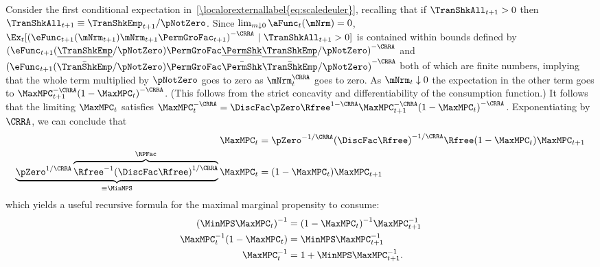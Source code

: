 \documentclass[\econtexRoot/BufferStockTheory]{subfiles}
\begin{document}
Consider the first conditional expectation in~\eqref{\localorexternallabel{eq:scaledeuler}},
recalling that if $\TranShkAll_{t+1}>0$ then $\TranShkAll_{t+1} \equiv
\TranShkEmp_{t+1}/\pNotZero$.  Since $\lim_{m \downarrow 0}
\aFunc_{t}(\mNrm) = 0$,
$\Ex_{t}[{(\eFunc_{t+1}(\mNrm_{t+1})\mNrm_{t+1}\PermGroFac_{t+1})}^{-\CRRA}~|~\TranShkAll_{t+1}>0]$
is contained within bounds defined by
${(\eFunc_{t+1}(\underline{\TranShkEmp}/\pNotZero) \PermGroFac\underline{\PermShk}
\underline{\TranShkEmp}/\pNotZero)}^{-\CRRA}$ and
${(\eFunc_{t+1}(\bar{\TranShkEmp}/\pNotZero) \PermGroFac\bar{\PermShk}
\bar{\TranShkEmp}/\pNotZero)}^{-\CRRA}$ both of which are finite numbers,
implying that the whole term multiplied by $\pNotZero$ goes to zero as
$\mNrm_{t}^{\CRRA}$ goes to zero.  As $\mNrm_{t} \downarrow 0$ the
expectation in the other term goes to $\MaxMPC _{t+1}^{-\CRRA
}{(1-\MaxMPC _{t})}^{-\CRRA }$. (This follows from the strict concavity
and differentiability of the consumption function.) It follows that
the limiting $\MaxMPC_{t}$ satisfies $\MaxMPC_{t}^{-\CRRA }=\DiscFac
\pZero\Rfree^{1-\CRRA }\MaxMPC_{t+1}^{-\CRRA }{(1-\MaxMPC
_{t})}^{-\CRRA }$. Exponentiating by $\CRRA$, we can conclude that
\begin{equation}\begin{gathered}\begin{aligned}
\MaxMPC_{t} & = \pZero^{-1/\CRRA} {(\DiscFac
\Rfree)}^{-1/\CRRA}\Rfree(1-\MaxMPC _{t})\MaxMPC _{t+1} \notag
\\ \underbrace{\pZero^{1/\CRRA}\overbrace{{\Rfree}^{-1}{(\DiscFac
    \Rfree)}^{1/\CRRA}}^{\RPFac}}_{\equiv \MinMPS}
\MaxMPC_{t} & = (1-\MaxMPC _{t})\MaxMPC _{t+1} \label{eq:MinMPSDef}
\end{aligned}\end{gathered}\end{equation}
which yields a useful recursive formula for the maximal marginal propensity to consume:
\begin{equation}\begin{gathered}\begin{aligned}
  {(\MinMPS \MaxMPC_{t})}^{-1}  & = {(1-\MaxMPC_{t})}^{-1}\MaxMPC_{t+1}^{-1}  \notag
\\ \MaxMPC_{t}^{-1}(1-\MaxMPC_{t})  & = \MinMPS \MaxMPC_{t+1}^{-1}   \notag
\\ \MaxMPC_{t}^{-1}  & = 1+\MinMPS \MaxMPC_{t+1}^{-1} \label{eq:MaxMPCInvApndx}.
\end{aligned}\end{gathered}\end{equation}
\end{document}
